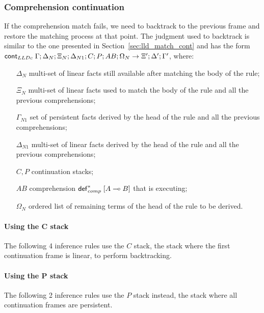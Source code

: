 

\subsubsection{Comprehension continuation}

If the comprehension match fails, we need to backtrack to the previous frame and
restore the matching process at that point. The judgment used to backtrack is
similar to the one presented in Section~\ref{sec:lld_match_cont} and has the
form $\mathsf{cont}_{LLDc} \; \Gamma; \Delta_N; \Xi_N; \Delta_{N1}; C; P; AB; \Omega_N
\rightarrow \Xi'; \Delta'; \Gamma'$, where:

\begin{enumerate}
   \item[$\Delta_N$] multi-set of linear facts still available after matching
   the body of the rule;
   \item[$\Xi_N$] multi-set of linear facts used to match the body of the rule
   and all the previous comprehensions;
   \item[$\Gamma_{N1}$] set of persistent facts derived by the head of the rule
   and all the previous comprehensions;
   \item[$\Delta_{N1}$] multi-set of linear facts derived by the head of the
   rule and all the previous comprehensions;
   \item[$C, P$] continuation stacks;
   \item[$AB$] comprehension $\mathsf{def}_{comp}^{*} \; [A \multimap B]$ that is executing;
   \item[$\Omega_N$] ordered list of remaining terms of the head of the rule to
   be derived.
\end{enumerate}

\paragraph{Using the C stack}

The following 4 inference rules use the $C$ stack, the stack where the first continuation frame is linear, to perform backtracking.



\paragraph{Using the P stack}

The following 2 inference rules use the $P$ stack instead, the stack where all
continuation frames are persistent.

